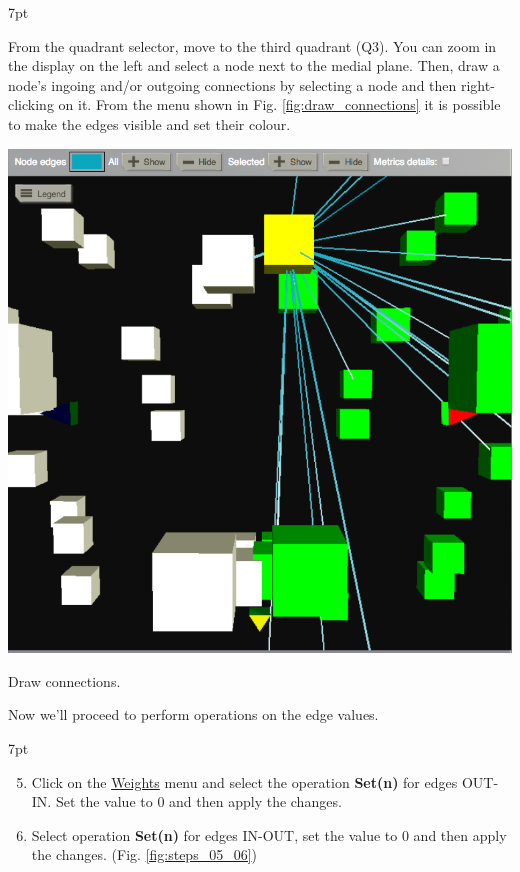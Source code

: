 \documentclass{tufte-handout}
\newenvironment{formal}{%
  \def\FrameCommand{%
    \hspace{1pt}%
    {\color{DarkBlue}\vrule width 2pt}%
    {\color{formalshade}\vrule width 4pt}%
    \colorbox{formalshade}%
  }%
  \MakeFramed{\advance\hsize-\width\FrameRestore}%
  \noindent\hspace{-4.55pt}%
  \begin{adjustwidth}{}{7pt}%
  \vspace{2pt}\vspace{2pt}%
}
{%
  \vspace{2pt}\end{adjustwidth}\endMakeFramed%
}
\newenvironment{blah}{%
  \def\FrameCommand{%
    \hspace{1pt}%
    {\color{DarkOrange}\vrule width 2pt}%
    {\color{PeachPuff}\vrule width 4pt}%
    \colorbox{PeachPuff}%
  }%
  \MakeFramed{\advance\hsize-\width\FrameRestore}%
  \noindent\hspace{-4.55pt}%
  \begin{adjustwidth}{}{7pt}%
  \vspace{2pt}\vspace{2pt}%
}
{%
  \vspace{2pt}\end{adjustwidth}\endMakeFramed%
}
\begin{document}
\begin{blah}
From the quadrant selector, move to the third quadrant (Q3). You can zoom in the display on the left and select a node next to the medial plane. Then, draw a node's ingoing and/or outgoing connections by selecting a node and then right-clicking on it. From the menu shown in Fig. \ref{fig:draw_connections} it is possible to make the edges visible and set their colour. 
\end{blah}
\begin{marginfigure}%
  \includegraphics[width=\linewidth]{Handout_UI_ModellingStructuralLesions_DrawConnections}%
  \caption{Draw connections.}%
  \label{fig:draw_connections}%
\end{marginfigure}%

\noindent Now we'll proceed to perform operations on the edge values. 

\begin{formal}
  \begin{enumerate}[resume]
  \setcounter{enumi}{4}
  \item Click on the \underline{Weights}  menu and select the operation \textbf{Set(n)} for edges OUT-IN. Set the value to 0 and then apply the changes. 
  \item Select operation \textbf{Set(n)} for edges IN-OUT, set the value to 0 and then apply the changes. (Fig. \ref{fig:steps_05_06})
  \end{enumerate}
\end{formal}
\end{document}
